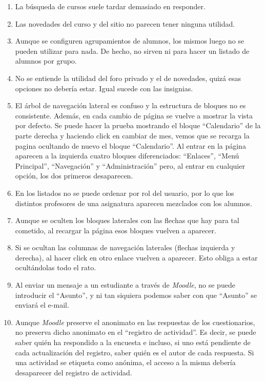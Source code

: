 \begin{enumerate}
\item La búsqueda de cursos suele tardar demasiado en responder.

\item Las novedades del curso y del sitio no parecen tener ninguna utilidad.

\item Aunque se configuren agrupamientos de alumnos, los mismos luego no se pueden utilizar para nada. De hecho, no sirven ni para hacer un listado de alumnos por grupo.

\item No se entiende la utilidad del foro privado y el de novedades, quizá esas opciones no debería estar. Igual sucede con las insignias.

\item El árbol de navegación lateral es confuso y la estructura de bloques no es consistente. Además, en cada cambio de página se vuelve a mostrar la vista por defecto. Se puede hacer la prueba mostrando el bloque ``Calendario'' de la parte derecha y haciendo click en cambiar de mes, vemos que se recarga la pagina ocultando de nuevo el bloque ``Calendario''. Al entrar en la página aparecen a la izquierda cuatro bloques diferenciados: ``Enlaces'', ``Menú Principal'', ``Navegación'' y ``Administración'' pero, al entrar en cualquier opción, los dos primeros desaparecen.

\item En los listados no se puede ordenar por rol del usuario, por lo que los distintos profesores de una asignatura aparecen mezclados con los alumnos.

\item Aunque se oculten los bloques laterales con las flechas que hay para tal cometido, al recargar la página esos bloques vuelven a aparecer.

\item Si se ocultan las columnas de navegación laterales (flechas izquierda y derecha), al hacer click en otro enlace vuelven a aparecer. Esto obliga a estar ocultándolas todo el rato.

\item Al enviar un mensaje a un estudiante a través de \textit{Moodle}, no se puede introducir el ``Asunto'', y ni tan siquiera podemos saber con que ``Asunto'' se enviará el e-mail. 

\item Aunque \textit{Moodle} preserve el anonimato en las respuestas de los cuestionarios, no preserva dicho anonimato en el ``registro de actividad''. Es decir, se puede saber quién ha respondido a la encuesta e incluso, si uno está pendiente de cada actualización del registro, saber quién es el autor de cada respuesta. Si una actividad se etiqueta como anónima, el acceso a la misma debería desaparecer del registro de actividad.


\end{enumerate}
